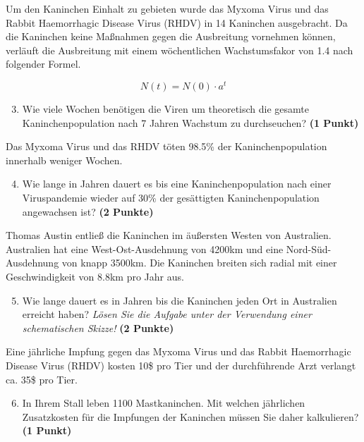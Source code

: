 \documentclass[a4paper, 9pt]{scrartcl}\usepackage[]{graphicx}\usepackage[]{xcolor}
\begin{document}
Um den Kaninchen Einhalt zu gebieten wurde das Myxoma Virus und das Rabbit
Haemorrhagic Disease Virus (RHDV) in 14 Kaninchen
ausgebracht. Da die Kaninchen keine Ma{\ss}nahmen gegen die Ausbreitung
vornehmen k{\"o}nnen, verl{\"a}uft die Ausbreitung mit einem w{\"o}chentlichen
Wachstumsfakor von 1.4 nach folgender Formel.

\begin{equation*}
  N(t) = N(0) \cdot a^t
\end{equation*}

\begin{enumerate}
  \setcounter{enumi}{2}
\item Wie viele Wochen ben{\"o}tigen die Viren um theoretisch die gesamte
  Kaninchenpopulation nach 7 Jahren Wachstum zu
  durchseuchen? \textbf{(1 Punkt)}
\end{enumerate}

Das Myxoma Virus und das RHDV t{\"o}ten 98.5\% der
Kaninchenpopulation innerhalb weniger Wochen.

\begin{enumerate}
  \setcounter{enumi}{3}  
\item Wie lange in Jahren dauert es bis eine Kaninchenpopulation nach einer
  Viruspandemie wieder auf 30\% der ges{\"a}ttigten
  Kaninchenpopulation angewachsen ist?  \textbf{(2 Punkte)}
\end{enumerate}

Thomas Austin entlie{\ss} die Kaninchen im {\"a}u{\ss}ersten Westen von
Australien. Australien hat eine West-Ost-Ausdehnung von 4200km
und eine Nord-S{\"u}d-Ausdehnung von knapp 3500km. Die Kaninchen
breiten sich radial mit einer Geschwindigkeit von 8.8km pro
Jahr aus.

\begin{enumerate}
  \setcounter{enumi}{4}
\item Wie lange dauert es in Jahren bis die Kaninchen jeden Ort
  in Australien erreicht haben? \textit{L{\"o}sen Sie die Aufgabe unter der
    Verwendung einer schematischen Skizze!} \textbf{(2 Punkte)}
\end{enumerate}

Eine j{\"a}hrliche Impfung gegen das Myxoma Virus und das Rabbit Haemorrhagic
Disease Virus (RHDV) kosten 10\$ pro Tier und der
durchf{\"u}hrende Arzt verlangt ca. 35\$ pro Tier.

\begin{enumerate}
  \setcounter{enumi}{5}
\item In Ihrem Stall leben 1100 Mastkaninchen. Mit welchen
  j{\"a}hrlichen Zusatzkosten f{\"u}r die Impfungen der Kaninchen m{\"u}ssen Sie daher
  kalkulieren? \textbf{(1 Punkt)}
\end{enumerate}
 
\end{document}
